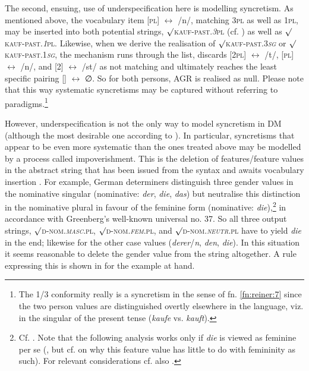 \documentclass[output=paper]{langsci/langscibook}
\begin{document}
The second, ensuing, use of underspecification here is modelling syncretism. As mentioned above, the vocabulary item [\textsc{pl}] $\leftrightarrow $ /n/, matching 3\textsc{pl} as well as 1\textsc{pl,} may be inserted into both potential strings, ${\surd}$\textsc{kauf}-\textsc{past}.\textit{3}\textsc{pl} (cf. ) as well as ${\surd}$\textsc{kauf}-\textsc{past}.\textit{1}\textsc{pl}. Likewise, when we derive the realisation of ${\surd}$\textsc{kauf}-\textsc{past}.3\textit{\textsc{sg}} or ${\surd}$\textsc{kauf}-\textsc{past}.1\textit{\textsc{sg}}, the mechanism runs through the list, discards [2\textsc{pl}] $\leftrightarrow $ /t/, [\textsc{pl}] $\leftrightarrow $ /n/, and [2] $\leftrightarrow $ /st/ as not matching and ultimately reaches the least specific pairing [] $\leftrightarrow $ ∅. So for both persons, AGR is realised as null. Please note that this way systematic syncretisms may be captured without referring to paradigms.\footnote{The 1/3 conformity really is a syncretism in the sense of fn. \ref{fn:reiner:7} since the two person values are distinguished overtly elsewhere in the language, viz. in the singular of the present tense (\textit{kaufe} vs. \textit{kauft}).}

However, underspecification is not the only way to model syncretism in DM (although the most desirable one according to \citealt[253]{Harley2008}). In particular, syncretisms that appear to be even more systematic than the ones treated above may be modelled by a process called impoverishment. This is the deletion of features/feature values in the abstract string that has been issued from the syntax and awaits vocabulary insertion \citep[139]{Embick2015}. For example, German determiners distinguish three gender values in the nominative singular (nominative: \textit{der}, \textit{die}, \textit{das}) but neutralise this distinction in the nominative plural in favour of the feminine form (nominative: \textit{die}),\footnote{Cf. \citet[214]{HelbigHelbig2001}. Note that the following analysis works only if \textit{die} is viewed as feminine per se (\citealt{Meinunger2017}, but cf. \citealt[291--292]{Leiss1994} on why this feature value has little to do with femininity as such). For relevant considerations cf. also \citet[184]{Kramer2019}.} in accordance with Greenberg’s well-known universal no. 37. So all three output strings, ${\surd}$\textsc{d}-\textsc{nom}.\textit{\textsc{masc}}.\textsc{pl}, ${\surd}$\textsc{d}-\textsc{nom}.\textit{\textsc{fem}}.\textsc{pl}, and ${\surd}$\textsc{d}-\textsc{nom}.\textit{\textsc{neutr}}.\textsc{pl} have to yield \textit{die} in the end; likewise for the other case values (\textit{derer}/\textit{n}, \textit{den}, \textit{die}). In this situation it seems reasonable to delete the gender value from the string altogether. A rule expressing this is shown in  for the example at hand.
\end{document}
